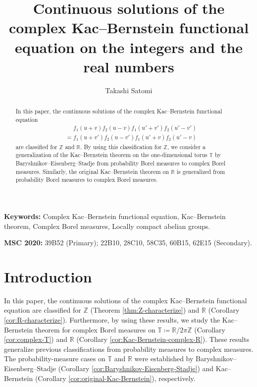 \documentclass[12pt]{article}
\title{Continuous solutions of the complex Kac--Bernstein functional equation on the integers and the real numbers}
\author{Takashi Satomi}
\theoremstyle{definition}
\theoremstyle{remark}
\numberwithin{equation}{section}
\numberwithin{figure}{section}
\numberwithin{table}{section}
\begin{document}
\maketitle

\begin{abstract}

In this paper, the continuous solutions of the complex Kac--Bernstein functional equation
\begin{align}
  & \phantom{ {} = {} }  f_1 ( u + v ) f_2 ( u - v ) f_1 ( u' + v' ) f_2 ( u' - v' ) \\
  & = f_1 ( u + v' ) f_2 ( u - v' ) f_1 ( u' + v ) f_2 ( u' - v )
\end{align}
are classified for $ \mathbb{ Z } $ and $ \mathbb{ R } $.
By using this classification for $ \mathbb{ Z } $, we consider a generalization of the Kac--Bernstein theorem on the one-dimensional torus $ \mathbb{ T } $ by Baryshnikov--Eisenberg--Stadje from probability Borel measures to complex Borel measures.
Similarly, the original Kac--Bernstein theorem on $ \mathbb{ R } $ is generalized from probability Borel measures to complex Borel measures.

\end{abstract}

\noindent
\textbf{Keywords:} Complex Kac--Bernstein functional equation, Kac--Bernstein theorem, Complex Borel measures, Locally compact abelian groups.

\noindent
\textbf{MSC 2020:} 39B52 (Primary); 22B10, 28C10, 58C35, 60B15, 62E15 (Secondary).

\section{Introduction}

In this paper, the continuous solutions of the complex Kac--Bernstein functional equation are classified for $ \mathbb{ Z } $ (Theorem \ref{thm:Z-characterize}) and $ \mathbb{ R } $ (Corollary \ref{cor:R-characterize}).
Furthermore, by using these results, we study the Kac--Bernstein theorem for complex Borel measures on $ \mathbb{ T } \coloneqq \mathbb{ R } / 2 \pi \mathbb{ Z } $ (Corollary \ref{cor:complex-T}) and $ \mathbb{ R } $ (Corollary \ref{cor:Kac-Bernstein-complex-R}).
These results generalize previous classifications from probability measures to complex measures.
The probability-measure cases on $ \mathbb{ T } $ and $ \mathbb{ R } $ were established by Baryshnikov--Eisenberg--Stadje (Corollary \ref{cor:Baryshnikov-Eisenberg-Stadje}) and Kac--Bernstein (Corollary \ref{cor:original-Kac-Bernstein}), respectively.
\end{document}
